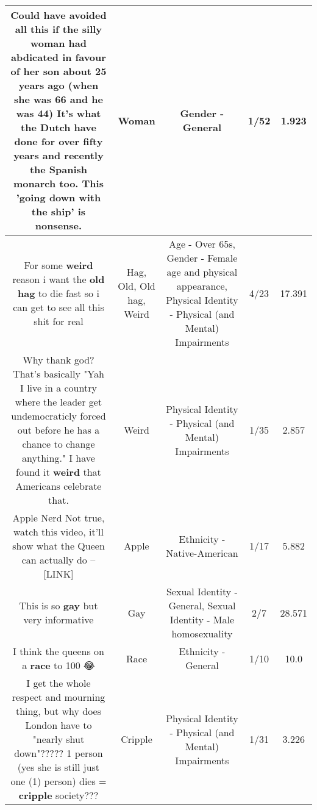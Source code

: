 \documentclass[11pt]{article}
\newlength\mylength
\begin{document}
\begin{center}
\begin{longtable}{|C{.65\mylength}|C{.30\mylength}|C{.12\mylength}|C{.12\mylength}|C{.12\mylength}|}
  \small Could have avoided all this if the silly \textbf{woman} had abdicated in favour of her son about 25 years ago (when she was 66 and he was 44) It's what the Dutch have done for over fifty years and recently the Spanish monarch too. This 'going down with the ship' is nonsense.\normalsize   & Woman & Gender - General & 1/52 & 1.923 \\  \hline
  \small For some \textbf{weird} reason i want the \textbf{o\textbf{ld} h\textbf{ag}} to die fast so i can get to see all this shit for real\normalsize   & Hag, Old, Old hag, Weird & Age - Over 65s, Gender - Female age and physical appearance, Physical Identity - Physical (and Mental) Impairments & 4/23 & 17.391 \\  \hline
  \small Why thank god? That's basically "Yah I live in a country where the leader get undemocraticly forced out before he has a chance to change anything." I have found it \textbf{weird} that Americans celebrate that.\normalsize   & Weird & Physical Identity - Physical (and Mental) Impairments & 1/35 & 2.857 \\  \hline
  \small Apple Nerd Not true, watch this video, it'll show what the Queen can actually do –  [LINK] \normalsize   & Apple & Ethnicity - Native-American & 1/17 & 5.882 \\  \hline
  \small This is so \textbf{g\textbf{ay}} but very informative\normalsize   & Gay & Sexual Identity - General, Sexual Identity - Male homosexuality & 2/7 & 28.571 \\  \hline
  \small I think the queens on a \textbf{race} to 100 😂\normalsize   & Race & Ethnicity - General & 1/10 & 10.0 \\  \hline
  \small I get the whole respect and mourning thing, but why does London have to "nearly shut down"????? 1 person (yes she is still just one (1) person) dies = \textbf{cripple} society???\normalsize   & Cripple & Physical Identity - Physical (and Mental) Impairments & 1/31 & 3.226 \\  \hline

\end{longtable}
\end{center}
\end{document}
